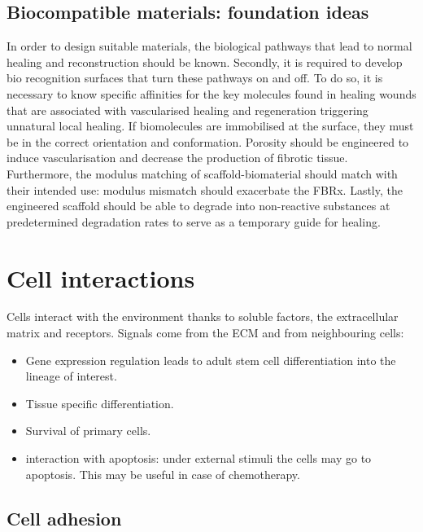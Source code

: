 	\subsection{Biocompatible materials: foundation ideas}
	In order to design suitable materials, the biological pathways that lead to normal healing and reconstruction should be known.
	Secondly, it is required to develop bio recognition surfaces that turn these pathways on and off.
	To do so, it is necessary to know specific affinities for the key molecules found in healing wounds that are associated with vascularised healing and regeneration triggering unnatural local healing.
	If biomolecules are immobilised at the surface, they must be in the correct orientation and conformation.
	Porosity should be engineered to induce vascularisation and decrease the production of fibrotic tissue.
	Furthermore, the modulus matching of scaffold-biomaterial should match with their intended use: modulus mismatch should exacerbate the FBRx.
	Lastly, the engineered scaffold should be able to degrade into non-reactive substances at predetermined degradation rates to serve as a temporary guide for healing.

\section{Cell interactions}
Cells interact with the environment thanks to soluble factors, the extracellular matrix and receptors.
Signals come from the ECM and from neighbouring cells:

\begin{multicols}{2}
	\begin{itemize}
		\item Gene expression regulation leads to adult stem cell differentiation into the lineage of interest.
		\item Tissue specific differentiation.
		\item Survival of primary cells.
		\item interaction with apoptosis: under external stimuli the cells may go to apoptosis.
			This may be useful in case of chemotherapy.
	\end{itemize}
\end{multicols}

	\subsection{Cell adhesion}

